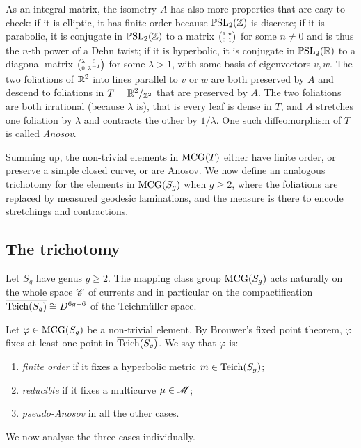 As an integral matrix, the isometry $A$ has also more properties that are easy to check: if it is elliptic, it has finite order because $\mathbb{P}{\rm SL}_2(\mathbb{Z})$ is discrete; if it is parabolic, it is conjugate in $\mathbb{P}{\rm SL}_2(\mathbb{Z})$ to a matrix $\matr 1 n 0 1$ for some $n\neq 0$ and is thus the $n$-th power of a Dehn twist; if it is hyperbolic, it is conjugate in $\mathbb{P}{\rm SL}_2(\mathbb{R})$ to a diagonal matrix $\matr \lambda 0 0 {\lambda^{-1}}$ for some $\lambda >1$, with some basis of eigenvectors $v,w$. The two foliations of $\mathbb{R}^2$ into lines parallel to $v$ or $w$ are both preserved by $A$ and descend to foliations in $T = \mathbb{R}^2/_{\mathbb{Z}^2}$ that are preserved by $A$. The two foliations are both irrational (because $\lambda$ is), that is every leaf is dense in $T$, and $A$ stretches one foliation by $\lambda$ and contracts the other by $1/\lambda$. One such diffeomorphism of $T$ is called \emph{Anosov}.

Summing up, the non-trivial elements in ${\rm MCG}(T)$ either have finite order, or preserve a simple closed curve, or are Anosov. We now define an analogous trichotomy for the elements in ${\rm MCG}(S_g)$ when $g\geqslant 2$, where the foliations are replaced by measured geodesic laminations, and the measure is there to encode stretchings and contractions.

\subsection{The trichotomy}
Let $S_g$ have genus $g\geqslant 2$. The mapping class group ${\rm MCG}(S_g)$ acts naturally on the whole space $\mathscr{C}$ of currents and in particular on the compactification $\overline{{\rm Teich}(S_g)} \cong D^{6g-6}$ of the Teichm\"uller space.

Let $\varphi \in {\rm MCG}(S_g)$ be a non-trivial element. By Brouwer's fixed point theorem, $\varphi$ fixes at least one point in $\overline{{\rm Teich}(S_g)}$. We say that $\varphi$ is:
\begin{enumerate}
\item \emph{finite order} if it fixes a hyperbolic metric $m \in {\rm Teich}(S_g)$;
\item \emph{reducible} if it fixes a multicurve $\mu \in \mathscr{M}$;
\item \emph{pseudo-Anosov} in all the other cases.
\end{enumerate}

We now analyse the three cases individually.

